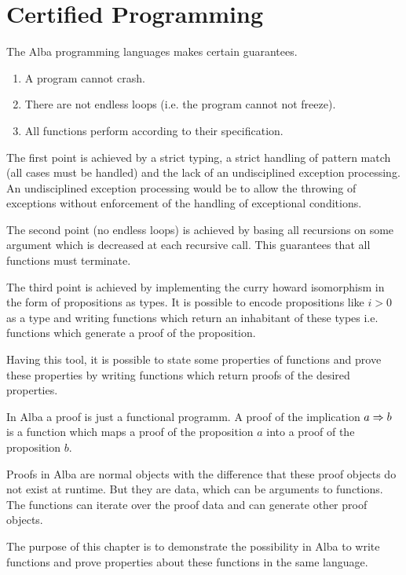 
\chapter{Certified Programming}
\label{chap:certprog}

The Alba programming languages makes certain guarantees.
\begin{enumerate}
\item A program cannot crash.

\item There are not endless loops (i.e. the program cannot not freeze).

\item All functions perform according to their specification.
\end{enumerate}

The first point is achieved by a strict typing, a strict handling of pattern
match (all cases must be handled) and the lack of an undisciplined exception
processing. An undisciplined exception processing would be to allow the
throwing of exceptions without enforcement of the handling of exceptional
conditions.

The second point (no endless loops) is achieved by basing all recursions on
some argument which is decreased at each recursive call. This guarantees that
all functions must terminate.

The third point is achieved by implementing the curry howard isomorphism in
the form of propositions as types. It is possible to encode propositions like
$i > 0$ as a type and writing functions which return an inhabitant of these
types i.e. functions which generate a proof of the proposition.

Having this tool, it is possible to state some properties of functions and
prove these properties by writing functions which return proofs of the
desired properties.

In Alba a proof is just a functional programm. A proof of the implication $a
\Rightarrow b$ is a function which maps a proof of the proposition $a$ into a proof
of the proposition $b$.

Proofs in Alba are normal objects with the difference that these proof objects
do not exist at runtime. But they are data, which can be arguments to
functions. The functions can iterate over the proof data and can generate
other proof objects.

The purpose of this chapter is to demonstrate the possibility in Alba to write
functions and prove properties about these functions in the same language.




